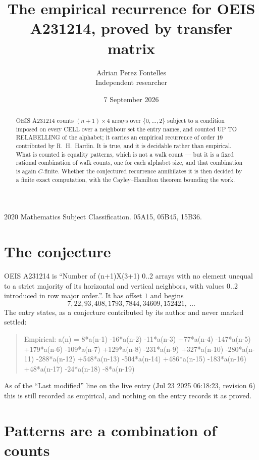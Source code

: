 \documentclass[11pt,a4paper]{article}
\title{The empirical recurrence for OEIS A231214, proved by transfer matrix}
\author{Adrian Perez Fontelles\\ \small Independent researcher}
\date{7 September 2026}
\theoremstyle{plain}
\theoremstyle{definition}
\begin{document}
\maketitle

\begin{abstract}
OEIS A231214 counts $(n+1)\times4$ arrays over $\{0,\dots,2\}$ subject to a condition imposed on
every CELL over a neighbour set the entry names, and counted UP TO RELABELLING of the
alphabet; it carries an empirical recurrence of order $19$ contributed by
R.~H.~Hardin. It is true, and it is decidable rather than empirical. What is counted is
equality patterns, which is not a walk count --- but it is a fixed rational combination of
walk counts, one for each alphabet size, and that combination is again $C$-finite. Whether the
conjectured recurrence annihilates it is then decided by a finite exact computation, with the
Cayley--Hamilton theorem bounding the work.
\end{abstract}

\noindent\small 2020 Mathematics Subject Classification. 05A15, 05B45, 15B36.\normalsize

\section{The conjecture}

OEIS A231214 is ``Number of (n+1)X(3+1) 0..2 arrays with no element unequal to a strict majority of its horizontal and vertical neighbors, with values 0..2 introduced in row major order.''. It has offset $1$ and begins
\[
7, 22, 93, 408, 1793, 7844, 34609, 152421,\ \dots
\]
The entry states, as a conjecture contributed by its author and never marked settled:
\begin{quote}
Empirical: a(n) = 8*a(n-1) -16*a(n-2) -11*a(n-3) +77*a(n-4) -147*a(n-5) +179*a(n-6) -109*a(n-7) +129*a(n-8) -231*a(n-9) +327*a(n-10) -280*a(n-11) -288*a(n-12) +548*a(n-13) -504*a(n-14) +486*a(n-15) -183*a(n-16) +48*a(n-17) -24*a(n-18) -8*a(n-19)
\end{quote}
As of the ``Last modified'' line on the live entry (Jul 23 2025 06:18:23, revision 6) this is still
recorded as empirical, and nothing on the entry records it as proved.

\section{Patterns are a combination of counts}
\end{document}
